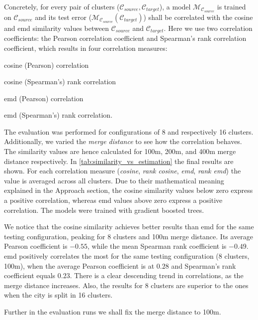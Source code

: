 \documentclass{ws-ijait}
\newcommand{\cmmnt}[1]{\ignorespaces}
\begin{document}
	Concretely, for every pair of clusters ($\mathcal{C}_{source}, \mathcal{C}_{target}$), a model $\mathcal{M}_{\mathcal{C}_{source}}$ is trained on $\mathcal{C}_{source}$ and its test error ($\mathcal{M}_{\mathcal{C}_{source}}(\mathcal{C}_{target})$) shall be correlated with the cosine and emd similarity values between $\mathcal{C}_{source}$ and $\mathcal{C}_{target}$. Here we use two correlation coefficients: the Pearson correlation coefficient and Spearman's rank correlation coefficient, which results in four correlation measures: 
	\begin{romanlist}
		\item	cosine (Pearson) correlation
		\item 	cosine (Spearman's) rank correlation
		\item 	emd (Pearson) correlation
		\item 	emd (Spearman's) rank correlation. 
	\end{romanlist}
	The evaluation was performed for configurations of 8 and respectively 16 clusters. Additionally, we varied the \textit{merge distance} to see how the correlation behaves. The similarity values are hence calculated for 100m, 200m, and 400m merge distance respectively. In \cref{tab:similarity_vs_estimation} the final results are shown. For each correlation measure (\textit{cosine}, \textit{rank cosine}, \textit{emd}, \textit{rank emd}) the value is averaged across all clusters. Due to their mathematical meaning explained in \cmmnt{\cref{realization:similarity_functions}} the Approach section, the cosine similarity values below zero express a positive correlation, whereas emd values above zero express a positive correlation. The models were trained with gradient boosted trees. 
	
	We notice that the cosine similarity achieves better results than emd for the same testing configuration, peaking for 8 clusters and 100m merge distance. Its average Pearson coefficient is $-0.55$, while the mean Spearman rank coefficient is $-0.49$. emd positively correlates the most for the same testing configuration (8 clusters, 100m), when the average Pearson coefficient is at $0.28$ and Spearman's rank coefficient equals $0.23$. There is a clear descending trend in correlations, as the merge distance increases.  Also, the results for 8 clusters are superior to the ones when the city is split in 16 clusters. 
	
	Further in the evaluation runs we shall fix the merge distance to 100m.
	
\end{document}
